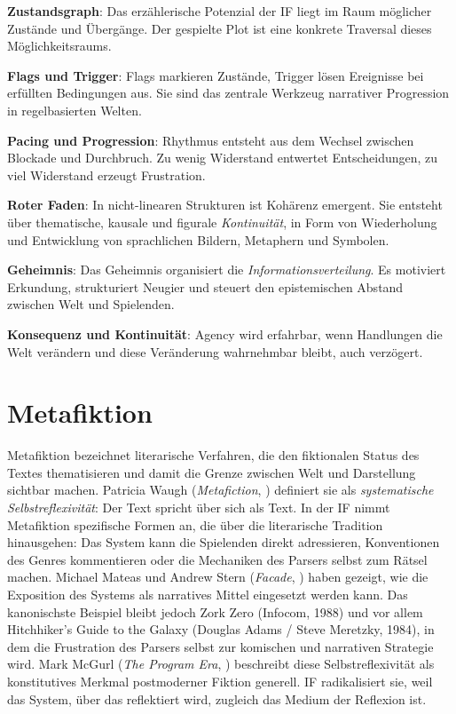 \documentclass[parskip=half,a4paper,11pt]{scrreprt}
\begin{document}
\textbf{Zustandsgraph}: Das erzählerische Potenzial der IF liegt im Raum möglicher Zustände und Übergänge. Der gespielte Plot ist eine konkrete Traversal dieses Möglichkeitsraums.

\textbf{Flags und Trigger}: Flags markieren Zustände, Trigger lösen Ereignisse bei erfüllten Bedingungen aus. Sie sind das zentrale Werkzeug narrativer Progression in regelbasierten Welten.

\textbf{Pacing und Progression}: Rhythmus entsteht aus dem Wechsel zwischen Blockade und Durchbruch. Zu wenig Widerstand entwertet Entscheidungen, zu viel Widerstand erzeugt Frustration.

\textbf{Roter Faden}: In nicht-linearen Strukturen ist Kohärenz emergent. Sie entsteht über thematische, kausale und figurale \textit{Kontinuität}, in Form von Wiederholung und Entwicklung von sprachlichen Bildern, Metaphern und Symbolen.

\textbf{Geheimnis}: Das Geheimnis organisiert die \textit{Informationsverteilung}. Es motiviert Erkundung, strukturiert Neugier und steuert den epistemischen Abstand zwischen Welt und Spielenden.

\textbf{Konsequenz und Kontinuität}: Agency wird erfahrbar, wenn Handlungen die Welt verändern und diese Veränderung wahrnehmbar bleibt, auch verzögert.

\section{Metafiktion}

Metafiktion bezeichnet literarische Verfahren, die den fiktionalen Status des Textes thematisieren und damit die Grenze zwischen Welt und Darstellung sichtbar machen. Patricia Waugh (\textit{Metafiction}, \citep{Waugh1984}) definiert sie als \textit{systematische Selbstreflexivität}: Der Text spricht über sich als Text. In der IF nimmt Metafiktion spezifische Formen an, die über die literarische Tradition hinausgehen: Das System kann die Spielenden direkt adressieren, Konventionen des Genres kommentieren oder die Mechaniken des Parsers selbst zum Rätsel machen. Michael Mateas und Andrew Stern (\textit{Facade}, \citep{Mateas2005}) haben gezeigt, wie die Exposition des Systems als narratives Mittel eingesetzt werden kann. Das kanonischste Beispiel bleibt jedoch Zork Zero (Infocom, 1988) und vor allem Hitchhiker's Guide to the Galaxy (Douglas Adams / Steve Meretzky, 1984), in dem die Frustration des Parsers selbst zur komischen und narrativen Strategie wird. Mark McGurl (\textit{The Program Era}, \citep{McGurl2009}) beschreibt diese Selbstreflexivität als konstitutives Merkmal postmoderner Fiktion generell. IF radikalisiert sie, weil das System, über das reflektiert wird, zugleich das Medium der Reflexion ist.
\end{document}
